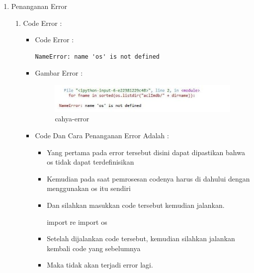 \begin{enumerate}
\item Penanganan Error
\begin{enumerate}
\par
\par
\item Code Error  :
\begin{itemize}
\item Code Error :
\begin{lstlisting}
NameError: name 'os' is not defined
\end{lstlisting}
\item Gambar Error :
\par
\begin{figure}[!hbtp]
\centering
\includegraphics[scale=0.3]{figures/cahya-error.jpg}
\caption{cahya-error}
\label{cahya-error}
\end{figure}
\par
\item Code Dan Cara Penanganan Error Adalah :
\begin{itemize}
\item Yang pertama pada error tersebut disini dapat dipastikan bahwa os tidak dapat terdefinisikan
\item Kemudian pada saat pemrosesan codenya harus di dahului dengan menggunakan os itu sendiri
\item Dan silahkan masukkan code tersebut kemudian jalankan.
\par
import re
import os
\item Setelah dijalankan code tersebut, kemudian silahkan jalankan kembali code yang  sebelumnya
\item Maka tidak akan terjadi error lagi.
\end{itemize}
\end{itemize}
\end{enumerate}
\end{enumerate}